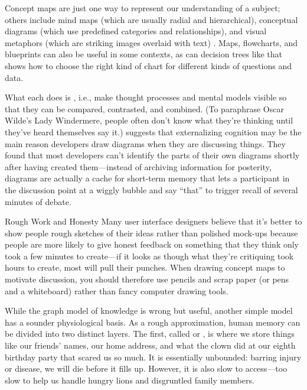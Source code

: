 Concept maps are just one way to represent our understanding of a
subject; others include mind maps (which are usually radial and
hierarchical), conceptual diagrams (which use predefined categories and
relationships), and visual metaphors (which are striking images overlaid
with text) \cite{Eppl2006}. Maps, flowcharts, and blueprints can also
be useful in some contexts, as can decision trees like
\cite{Abel2009} that shows how to choose the right kind of chart for
different kinds of questions and data.

What each does is ,
i.e., make thought processes and mental models visible so that they
can be compared, contrasted, and combined.
(To paraphrase Oscar Wilde's Lady Windermere,
people often don't know what they're thinking until they've heard themselves say it.)
\cite{Cher2007} suggests that externalizing cognition may be the main reason
developers draw diagrams when they are discussing things. They found
that most developers can't identify the parts of their own diagrams
shortly after having created them---instead of archiving information
for posterity, diagrams are actually a cache for short-term memory
that lets a participant in the discussion point at a wiggly bubble and
say ``that'' to trigger recall of several minutes of debate.

\begin{aside}{Rough Work and Honesty}
  Many user interface designers believe that it's better to show people
  rough sketches of their ideas rather than polished mock-ups because
  people are more likely to give honest feedback on something that they
  think only took a few minutes to create---if it looks as though what
  they're critiquing took hours to create, most will pull their punches.
  When drawing concept maps to motivate discussion, you should therefore
  use pencils and scrap paper (or pens and a whiteboard) rather than
  fancy computer drawing tools.
\end{aside}


While the graph model of knowledge is wrong but useful, another simple
model has a sounder physiological basis. As a rough approximation,
human memory can be divided into two distinct layers. The first,
called  or , is where we store things like our
friends' names, our home address, and what the clown did at our eighth
birthday party that scared us so much. It is essentially unbounded:
barring injury or disease, we will die before it fills up. However,
it is also slow to access---too slow to help us handle hungry lions
and disgruntled family members.

